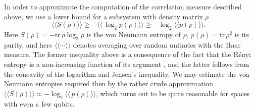 \documentclass[twocolumn,aps,showpacs,prl]{revtex4}
\begin{document}
In order to approximate the computation of the correlation measure
described above, we use a lower bound for a subsystem with
density matrix $\rho$
\begin{equation}
\langle\!\langle S(\rho) \rangle\!\rangle
\ge -\langle\!\langle \,\log_2 p(\rho) \rangle\!\rangle
\ge -\log_2 \langle\!\langle p(\rho) \rangle\!\rangle. %
\end{equation}
Here $S(\rho)=-{\text{tr}}\, \rho \log_2 \rho$ is the von Neumann entropy
of $\rho$, $p(\rho)= {\text{tr}}\, \rho^2$ is its purity, and here
$\langle\!\langle \cdots \rangle\!\rangle$ denotes averaging over
random unitaries with the Haar measure. The former inequality above is
a consequence of the fact that the R\'enyi entropy is a non-increasing
function of its argument \cite{Bengtssonapp}, and the latter follows from the
concavity of the logarithm and Jensen's inequality. We may estimate
the von Neumann entropies required then by the rather crude
approximation
$\langle\!\langle S(\rho) \rangle\!\rangle
\approx -\log_2 \langle\!\langle \,p(\rho) \rangle\!\rangle$, 
which turns out to be quite reasonable for spaces with even a few qubits.
\end{document}
